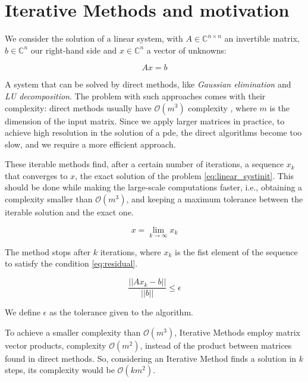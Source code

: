 \section{Iterative Methods and motivation}

We consider the solution of a linear system, with $A \in \mathbb{C}^{n \times n}$ an invertible matrix, $b \in \mathbb{C}^{n}$ our right-hand side and $x\in \mathbb{C}^{n}$ a vector of unknowns:

\begin{equation}\label{eq:linear_systinit}
    Ax=b
\end{equation}


A system that can be solved by direct methods, like \textit{Gaussian elimination} and \textit{LU decomposition}. The problem with such approaches comes with their complexity: direct methods usually have $\mathcal{O}(m^{3})$ complexity \cite{trefethen1998numerical}, where $m$ is the dimension of the input matrix. Since we apply larger matrices in practice, to achieve high resolution in the solution of a \acrshort{pde}, the direct algorithms become too slow, and we require a more efficient approach.


These iterable methods find, after a certain number of iterations, a sequence ${x_{k}}$ that converges to $x$, the exact solution of the problem \ref{eq:linear_systinit}. This should be done while making the large-scale computations faster, i.e., obtaining a complexity smaller than $\mathcal{O}(m^{3})$, and keeping a maximum tolerance between the iterable solution and the exact one.


\begin{equation}\label{eq:suite}
    x = \lim_{k \to \infty} x_{k}
\end{equation}


The method stops after $k$ iterations, where $x_{k}$ is the fist element of the sequence to satisfy the condition \ref{eq:residual}.

\begin{equation}\label{eq:residual}
    \frac{||Ax_{k} - b||}{||b||} \leq \epsilon
\end{equation}

We define $\epsilon$ as the tolerance given to the algorithm.

To achieve a smaller complexity than $\mathcal{O}(m^{3})$, Iterative Methods employ matrix vector products, complexity $\mathcal{O}(m^{2})$, instead of the product between matrices found in direct methods. So, considering an Iterative Method finds a solution in $k$ steps, its complexity would be $\mathcal{O}(km^{2})$.

